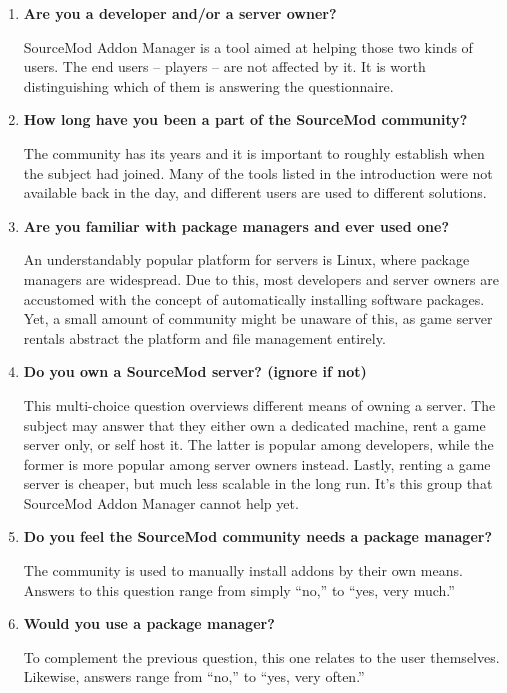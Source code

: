 \begin{enumerate}
    \item \textbf{Are you a developer and/or a server owner?}

    SourceMod Addon Manager is a tool aimed at helping those two kinds of users.
    The end users -- players -- are not affected by it.
    It is worth distinguishing which of them is answering the questionnaire.

    \item \textbf{How long have you been a part of the SourceMod community?}

    The community has its years and it is important to roughly establish when the subject had joined.
    Many of the tools listed in the introduction were not available back in the day, and different users are used to different solutions.

    \item \textbf{Are you familiar with package managers and ever used one?}

    An understandably popular platform for servers is Linux, where package managers are widespread.
    Due to this, most developers and server owners are accustomed with the concept of automatically installing software packages.
    Yet, a small amount of community might be unaware of this, as game server rentals abstract the platform and file management entirely.

    \item \textbf{Do you own a SourceMod server? (ignore if not)}

    This multi-choice question overviews different means of owning a server.
    The subject may answer that they either own a dedicated machine, rent a game server only, or self host it.
    The latter is popular among developers, while the former is more popular among server owners instead.
    Lastly, renting a game server is cheaper, but much less scalable in the long run.
    It's this group that SourceMod Addon Manager cannot help yet.

    \item \textbf{Do you feel the SourceMod community needs a package manager?}

    The community is used to manually install addons by their own means.
    Answers to this question range from simply ``no,'' to ``yes, very much.''

    \item \textbf{Would you use a package manager?}

    To complement the previous question, this one relates to the user themselves.
    Likewise, answers range from ``no,'' to ``yes, very often.''


\end{enumerate}
